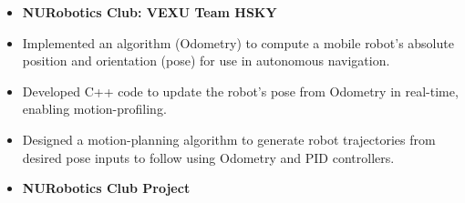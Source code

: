 \documentclass[10pt,a4paper,ragged2e,withhyper]{altacv}
\begin{document}
\begin{paracol}{2}
    \switchcolumn
    \vspace{-0.15em}

    \vspace{-2em}
    \begin{itemize}
        \item[] \textbf{NURobotics Club: VEXU Team HSKY}
        \item Implemented an algorithm (Odometry) to compute a mobile robot's absolute position and orientation (pose) for use in autonomous navigation.
        \item Developed C++ code to update the robot's pose from Odometry in real-time, enabling motion-profiling.
        \item Designed a motion-planning algorithm to generate robot trajectories from desired pose inputs to follow using Odometry and PID controllers.
    \end{itemize}
    \begin{itemize}
        \item[] \textbf{NURobotics Club Project}

\end{itemize}
\end{paracol}
\end{document}
